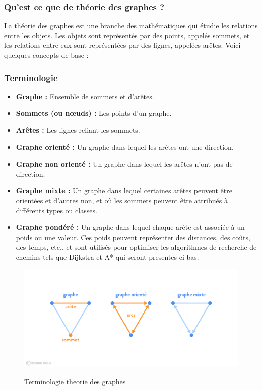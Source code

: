 \subsubsection{Qu'est ce que de théorie des graphes ?}

La théorie des graphes est une branche des mathématiques qui étudie les relations entre les objets. Les objets sont représentés par des points, appelés sommets, et les relations entre eux sont représentées par des lignes, appelées arêtes. Voici quelques concepts de base :

\subsubsection{Terminologie}

\begin{itemize}
    \item \textbf{Graphe :} Ensemble de sommets et d'arêtes.
    \item \textbf{Sommets (ou nœuds) :} Les points d'un graphe.
    \item \textbf{Arêtes :} Les lignes reliant les sommets.
    \item \textbf{Graphe orienté :} Un graphe dans lequel les arêtes ont une direction.
    \item \textbf{Graphe non orienté :} Un graphe dans lequel les arêtes n'ont pas de direction.
    \item \textbf{Graphe mixte :} Un graphe dans lequel certaines arêtes peuvent être orientées et d'autres non, et où les sommets peuvent être attribués à différents types ou classes.
    \item \textbf{Graphe pondéré :} Un graphe dans lequel chaque arête est associée à un poids ou une valeur. Ces poids peuvent représenter des distances, des coûts, des temps, etc., et sont utilisés pour optimiser les algorithmes de recherche de chemins tels que Dijkstra et A* qui seront presentes ci bas.
\end{itemize}


\begin{figure}[h]
    \centering
    \includegraphics[width=0.9\linewidth]{Images/sommets.png}
    \caption{Terminologie theorie des graphes}
    \cite{graph_image2}
\end{figure}

